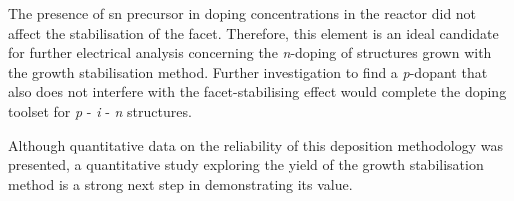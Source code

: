 The presence of \acl{sn} precursor in doping concentrations in the reactor did not affect the stabilisation of the  facet. Therefore, this element is an ideal candidate for further electrical analysis concerning the \textit{n}-doping of structures grown with the growth stabilisation method. Further investigation to find a \textit{p}-dopant that also does not interfere with the facet-stabilising effect would complete the doping toolset for \textit{p} - \textit{i} - \textit{n} structures.

Although quantitative data on the reliability of this deposition methodology was presented, a quantitative study exploring the yield of the growth stabilisation method is a strong next step in demonstrating its value. 